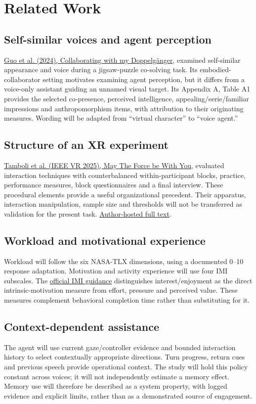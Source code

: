 \documentclass[11pt,letterpaper]{article}
\begin{document}
\setcounter{section}{1}
\section{Related Work}
\subsection{Self-similar voices and agent perception}
\href{https://doi.org/10.1145/3651288}{Guo et al. (2024), Collaborating with my Doppelg\"anger}, examined self-similar appearance and voice during a jigsaw-puzzle co-solving task. Its embodied-collaborator setting motivates examining agent perception, but it differs from a voice-only assistant guiding an unnamed visual target. Its Appendix A, Table A1 provides the selected co-presence, perceived intelligence, appealing/eerie/familiar impressions and anthropomorphism items, with attribution to their originating measures. Wording will be adapted from ``virtual character'' to ``voice agent.''

\subsection{Structure of an XR experiment}
\href{https://doi.org/10.1109/VR59515.2025.00071}{Tamboli et al. (IEEE VR 2025), May The Force be With You}, evaluated interaction techniques with counterbalanced within-participant blocks, practice, performance measures, block questionnaires and a final interview. These procedural elements provide a useful organizational precedent. Their apparatus, interaction manipulation, sample size and thresholds will not be transferred as validation for the present task. \href{https://encoderesearchlab.org/wp-content/uploads/2025/09/tamboli-ieeevr.pdf}{Author-hosted full text}.

\subsection{Workload and motivational experience}
Workload will follow the six NASA-TLX dimensions, using a documented 0--10 response adaptation. Motivation and activity experience will use four IMI subscales. The \href{https://selfdeterminationtheory.org/intrinsic-motivation-inventory/}{official IMI guidance} distinguishes interest/enjoyment as the direct intrinsic-motivation measure from effort, pressure and perceived value. These measures complement behavioral completion time rather than substituting for it.

\subsection{Context-dependent assistance}
The agent will use current gaze/controller evidence and bounded interaction history to select contextually appropriate directions. Turn progress, return cues and previous speech provide operational context. The study will hold this policy constant across voices; it will not independently estimate a memory effect. Memory use will therefore be described as a system property, with logged evidence and explicit limits, rather than as a demonstrated source of engagement.
\end{document}
